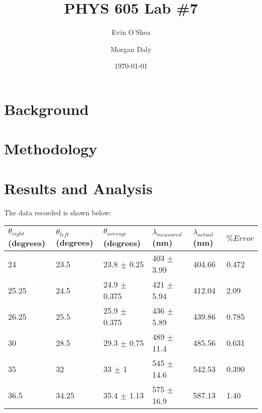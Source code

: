\documentclass[singlecolumn, amsmath]{revtex4}
\begin{document}
\title{PHYS 605 Lab \#7} 

\author{Evin O'Shea}  %
\author{Morgan Daly}
\date{\today}  


\begin{abstract}

	

\end{abstract}

\maketitle

%
%
\section{Background}

	

\section{Methodology}

	
\newpage

\section{Results and Analysis}

	The data recorded is shown below:

\begin{center}
    \begin{tabular}{| l | l | l | l | l | l |}
    \hline
    $\theta_{right}$ (degrees) & $\theta_{left}$ (degrees) & $\theta_{average}$ (degrees) & $\lambda_{measured}$ (nm)& $\lambda_{actual}$ (nm) & $\% Error $ \\ \hline
    
    24    & 23.5  & 23.8 $\pm$ 0.25 	& 403 $\pm$ 3.99 & 404.66 & 0.472  \\ \hline
    25.25 & 24.5  & 24.9 $\pm$ 0.375 	& 421 $\pm$ 5.94 & 412.04 & 2.09 \\ \hline
    26.25 & 25.5  & 25.9 $\pm$ 0.375 	& 436 $\pm$ 5.89 & 439.86 & 0.785  \\ \hline
    30    & 28.5  & 29.3 $\pm$ 0.75 	& 489 $\pm$ 11.4 & 485.56 & 0.631  \\ \hline
    35    & 32    & 33 $\pm$ 1 		& 545 $\pm$ 14.6 & 542.53 & 0.390  \\ \hline
    36.5  & 34.25 & 35.4 $\pm$ 1.13	& 575 $\pm$ 16.9 & 587.13 & 1.40  \\
    \hline
    \end{tabular}
\end{center}
\end{document}

